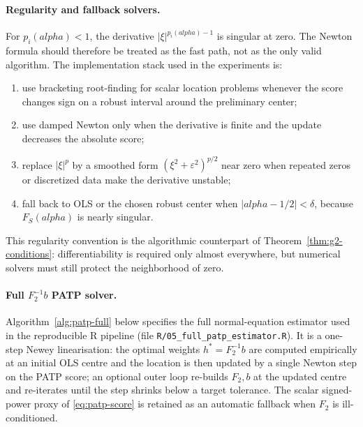 \documentclass[11pt]{article}
\def\alpha{alpha}%
\def\mathbf#1{#1}%
\def\tfrac#1#2{#1/#2}%
\theoremstyle{definition}
\begin{document}
\paragraph{Regularity and fallback solvers.}
For $p_i(\alpha)<1$, the derivative
$|\xi|^{p_i(\alpha)-1}$ is singular at zero. The Newton formula should
therefore be treated as the fast path, not as the only valid algorithm. The
implementation stack used in the experiments is:
\begin{enumerate}
  \item use bracketing root-finding for scalar location problems whenever the
        score changes sign on a robust interval around the preliminary
        center;
  \item use damped Newton only when the derivative is finite and the update
        decreases the absolute score;
  \item replace $|\xi|^p$ by a smoothed form
        $(\xi^2+\varepsilon^2)^{p/2}$ near zero when repeated zeros or
        discretized data make the derivative unstable;
  \item fall back to OLS or the chosen robust center when
        $|\alpha-\tfrac{1}{2}|<\delta$, because
        $\mathbf{F}_S(\alpha)$ is nearly singular.
\end{enumerate}
This regularity convention is the algorithmic counterpart of
Theorem~\ref{thm:g2-conditions}: differentiability is required only almost
everywhere, but numerical solvers must still protect the neighborhood of zero.

\paragraph{Full $\mathbf{F}_2^{-1}\mathbf{b}$ PATP solver.}
Algorithm~\ref{alg:patp-full} below specifies the full normal-equation
estimator used in the reproducible R pipeline (file
\texttt{R/05\_full\_patp\_estimator.R}). It is a one-step Newey
linearisation: the optimal weights $\mathbf{h}^{*}=\mathbf{F}_2^{-1}\mathbf{b}$
are computed empirically at an initial OLS centre and the location is then
updated by a single Newton step on the PATP score; an optional outer loop
re-builds $\mathbf{F}_2,\mathbf{b}$ at the updated centre and re-iterates
until the step shrinks below a target tolerance. The scalar signed-power
proxy of \eqref{eq:patp-score} is retained as an automatic fallback when
$\mathbf{F}_2$ is ill-conditioned.
\end{document}
